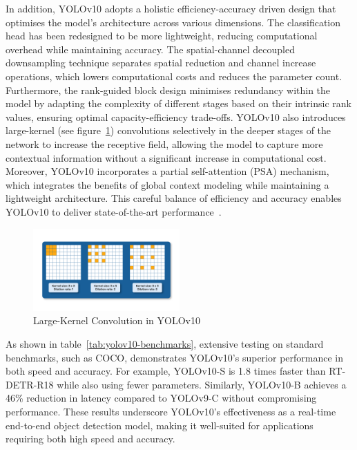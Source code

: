 \documentclass[12pt,oneside]{book} %
\begin{document}
In addition, YOLOv10 adopts a holistic efficiency-accuracy driven design that
optimises the model’s architecture across various dimensions. The
classification head has been redesigned to be more lightweight, reducing
computational overhead while maintaining accuracy. The spatial-channel
decoupled downsampling technique separates spatial reduction and channel
increase operations, which lowers computational costs and reduces the parameter
count. Furthermore, the rank-guided block design minimises redundancy within
the model by adapting the complexity of different stages based on their
intrinsic rank values, ensuring optimal capacity-efficiency trade-offs. YOLOv10
also introduces large-kernel (see figure~\ref{fig:large-kernel-yolov10})
convolutions selectively in the deeper stages of the network to increase the
receptive field, allowing the model to capture more contextual information
without a significant increase in computational cost. Moreover, YOLOv10
incorporates a partial self-attention (PSA) mechanism, which integrates the
benefits of global context modeling while maintaining a lightweight
architecture. This careful balance of efficiency and accuracy enables YOLOv10
to deliver state-of-the-art
performance~\cite{wang2024yolov10,LearnOpenCVYOLOv10}.

\begin{figure}[H]
    \centering
    \includegraphics[width=0.5\textwidth]{figures/KernelYOLOv10.png}
    \caption{Large-Kernel Convolution in YOLOv10~\cite{LearnOpenCVYOLOv10}}\label{fig:large-kernel-yolov10}
\end{figure}

As shown in table~\ref{tab:yolov10-benchmarks}, extensive testing on standard
benchmarks, such as COCO, demonstrates YOLOv10’s superior performance in both
speed and accuracy. For example, YOLOv10-S is 1.8 times faster than RT-DETR-R18
while also using fewer parameters. Similarly, YOLOv10-B achieves a 46\%
reduction in latency compared to YOLOv9-C without compromising performance.
These results underscore YOLOv10’s effectiveness as a real-time end-to-end
object detection model, making it well-suited for applications requiring both
high speed and accuracy.
\end{document}
